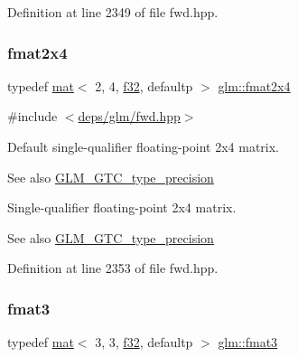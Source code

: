 Definition at line 2349 of file fwd.\+hpp.

\mbox{\label{group__gtc__type__precision_gabaf7537f5284456254b1da1cd6fd2b78}} 
\subsubsection{\texorpdfstring{fmat2x4}{fmat2x4}}
{\footnotesize\ttfamily typedef \hyperlink{structglm_1_1mat}{mat}$<$ 2, 4, \hyperlink{group__gtc__type__precision_ga0ec999b57f5330d9021256e96038df04}{f32}, defaultp $>$ \hyperlink{group__gtc__type__precision_gabaf7537f5284456254b1da1cd6fd2b78}{glm\+::fmat2x4}}



{\ttfamily \#include $<$\hyperlink{fwd_8hpp}{deps/glm/fwd.\+hpp}$>$}

Default single-\/qualifier floating-\/point 2x4 matrix. \begin{DoxySeeAlso}{See also}
\hyperlink{group__gtc__type__precision}{G\+L\+M\+\_\+\+G\+T\+C\+\_\+type\+\_\+precision}
\end{DoxySeeAlso}
Single-\/qualifier floating-\/point 2x4 matrix. \begin{DoxySeeAlso}{See also}
\hyperlink{group__gtc__type__precision}{G\+L\+M\+\_\+\+G\+T\+C\+\_\+type\+\_\+precision} 
\end{DoxySeeAlso}


Definition at line 2353 of file fwd.\+hpp.

\mbox{\label{group__gtc__type__precision_ga5d1e667b4d603704203af21ff6dbe4e5}} 
\subsubsection{\texorpdfstring{fmat3}{fmat3}}
{\footnotesize\ttfamily typedef \hyperlink{structglm_1_1mat}{mat}$<$ 3, 3, \hyperlink{group__gtc__type__precision_ga0ec999b57f5330d9021256e96038df04}{f32}, defaultp $>$ \hyperlink{group__gtc__type__precision_ga5d1e667b4d603704203af21ff6dbe4e5}{glm\+::fmat3}}



